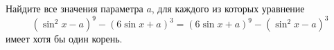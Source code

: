 \begin{ex}
	\begin{condition}
		Найдите все значения параметра \( a \), для каждого из которых уравнение \[ (\sin^2x-a)^9-(6\sin x+a)^3=(6\sin x+a)^9-(\sin^2x-a)^3 \] имеет хотя бы один корень.
	\end{condition}
\end{ex}